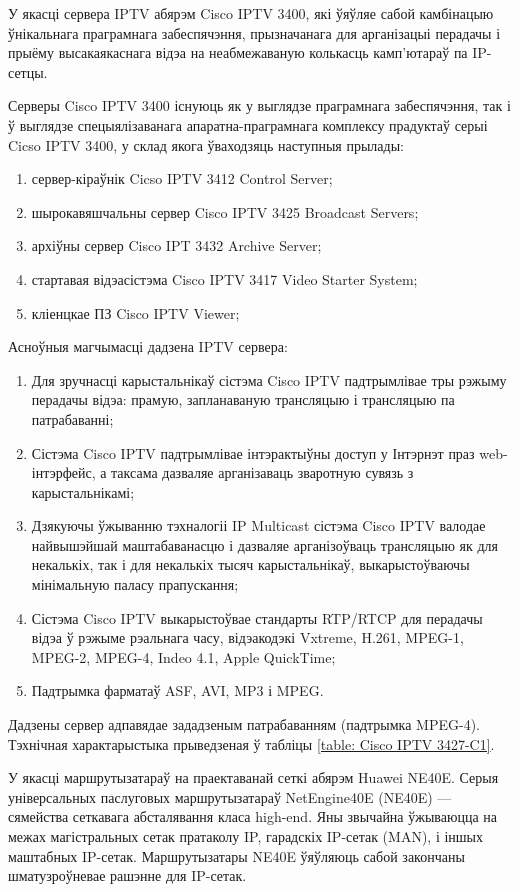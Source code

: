 У якасці сервера IPTV абярэм Cisco IPTV 3400, які ўяўляе
сабой камбінацыю ўнікальнага праграмнага забеспячэння, прызначанага для
арганізацыі перадачы і прыёму высакаякаснага відэа на неабмежаваную колькасць камп'ютараў па IP-сетцы.

Серверы Cisco IPTV 3400 існуюць як у выглядзе праграмнага забеспячэння, так і ў
выглядзе спецыялізаванага апаратна-праграмнага комплексу прадуктаў серыі Cicso IPTV 3400, у склад якога ўваходзяць наступныя прылады:
\begin{enumerate}
    \item сервер-кіраўнік Cicso IPTV 3412 Control Server;
    \item шырокавяшчальны сервер Cisco IPTV 3425 Broadcast Servers;
    \item архіўны сервер Cisco IPT 3432 Archive Server;
    \item стартавая відэасістэма Cisco IPTV 3417 Video Starter System;
    \item кліенцкае ПЗ Cisco IPTV Viewer;
\end{enumerate}

Асноўныя магчымасці дадзена IPTV сервера:
\begin{enumerate}
    \item Для зручнасці карыстальнікаў сістэма Cisco IPTV падтрымлівае тры рэжыму перадачы відэа: прамую, запланаваную трансляцыю і трансляцыю па патрабаванні;
    \item Сістэма Cisco IPTV падтрымлівае інтэрактыўны доступ у Інтэрнэт праз web-інтэрфейс, а таксама дазваляе арганізаваць зваротную сувязь з карыстальнікамі;
    \item Дзякуючы ўжыванню тэхналогіі IP Multicast сістэма Cisco IPTV валодае найвышэйшай маштабаванасцю і дазваляе арганізоўваць трансляцыю як для некалькіх, так і для некалькіх тысяч карыстальнікаў, выкарыстоўваючы мінімальную паласу прапускання;
    \item Сістэма Cisco IPTV выкарыстоўвае стандарты RTP/RTCP для перадачы відэа ў рэжыме рэальнага часу, відэакодэкі Vxtreme, H.261, MPEG-1, MPEG-2, MPEG-4, Indeo 4.1, Apple QuickTime;
    \item Падтрымка фарматаў ASF, AVI, MP3 і MPEG.
\end{enumerate}

Дадзены сервер адпавядае зададзеным патрабаванням (падтрымка MPEG-4).
Тэхнічная характарыстыка прыведзеная ў табліцы
\ref{table: Cisco IPTV 3427-C1}.

У якасці маршрутызатараў на праектаванай сеткі абярэм Huawei NE40E. Серыя універсальных паслуговых маршрутызатараў NetEngine40E (NE40E) --- сямейства сеткавага абсталявання класа high-end. Яны звычайна ўжываюцца на межах магістральных сетак пратаколу IP, гарадскіх IP-сетак (MAN), і іншых маштабных IP-сетак. Маршрутызатары NE40E ўяўляюць сабой закончаны шматузроўневае рашэнне для IP-сетак.

